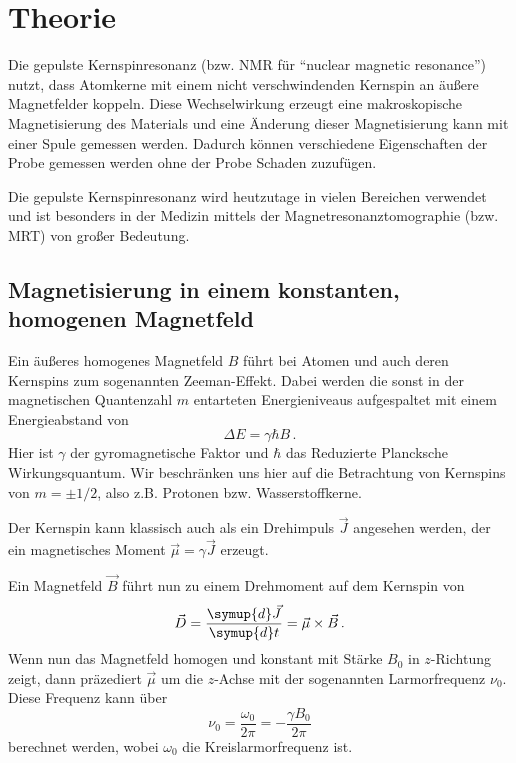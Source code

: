 \section{Theorie}
\label{sec:Theorie}

Die gepulste Kernspinresonanz (bzw. NMR für \enquote{nuclear magnetic resonance}) nutzt, dass Atomkerne mit einem nicht verschwindenden Kernspin an äußere Magnetfelder koppeln.
Diese Wechselwirkung erzeugt eine makroskopische Magnetisierung des Materials und eine Änderung dieser Magnetisierung kann mit einer Spule gemessen werden.
Dadurch können verschiedene Eigenschaften der Probe gemessen werden ohne der Probe Schaden zuzufügen.

Die gepulste Kernspinresonanz wird heutzutage in vielen Bereichen verwendet und 
ist besonders in der Medizin mittels der Magnetresonanztomographie (bzw. MRT) von großer Bedeutung.

\subsection{Magnetisierung in einem konstanten, homogenen Magnetfeld}
\label{ssec:Magnetisierung_konstant}

Ein äußeres homogenes Magnetfeld $B$ führt bei Atomen und auch deren Kernspins zum sogenannten Zeeman-Effekt.
Dabei werden die sonst in der magnetischen Quantenzahl $m$ entarteten Energieniveaus aufgespaltet 
mit einem Energieabstand von
\begin{equation}
    \Delta E = \gamma \hbar B \, .
\end{equation}
Hier ist $\gamma$ der gyromagnetische Faktor und $\hbar$ das Reduzierte Plancksche Wirkungsquantum.
Wir beschränken uns hier auf die Betrachtung von Kernspins von $m=\pm 1/2$, also z.B. Protonen bzw. Wasserstoffkerne.

Der Kernspin kann klassisch auch als ein Drehimpuls $\vec{J}$ angesehen werden, der ein magnetisches Moment $\vec{\mu} = \gamma \vec{J}$ erzeugt.

Ein Magnetfeld $\vec{B}$ führt nun zu einem Drehmoment auf dem Kernspin von
\begin{equation}
    \vec{D} = \frac{\symup{d} \vec{J}}{\symup{d} t} = \vec{\mu} \times \vec{B} \, .
\end{equation}
Wenn nun das Magnetfeld homogen und konstant mit Stärke $B_0$ in $z$-Richtung zeigt, 
dann präzediert $\vec{\mu}$ um die $z$-Achse mit der sogenannten Larmorfrequenz $\nu_0$.
Diese Frequenz kann über
\begin{equation}
    \nu_0 = \frac{\omega_0}{2 \pi} = - \frac{\gamma B_0}{2 \pi}
    \label{eq:Larmorfrequenz}
\end{equation}
berechnet werden, wobei $\omega_0$ die Kreislarmorfrequenz ist.


